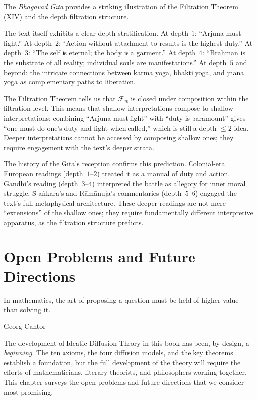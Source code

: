 \documentclass[11pt,openany]{book}
\theoremstyle{definition}
\theoremstyle{plain}
\theoremstyle{remark}
\newcommand{\Filt}[1]{\mathcal{F}_{#1}}     %
\begin{document}
The \emph{Bhagavad G\=\i t\=a} provides a striking illustration of the Filtration Theorem (XIV) and the depth filtration structure.

The text itself exhibits a clear depth stratification. At depth~$1$: ``Arjuna must fight.'' At depth~$2$: ``Action without attachment to results is the highest duty.'' At depth~$3$: ``The self is eternal; the body is a garment.'' At depth~$4$: ``Brahman is the substrate of all reality; individual souls are manifestations.'' At depth~$5$ and beyond: the intricate connections between karma yoga, bhakti yoga, and jnana yoga as complementary paths to liberation.

The Filtration Theorem tells us that $\Filt{m}$ is closed under composition within the filtration level. This means that shallow interpretations compose to shallow interpretations: combining ``Arjuna must fight'' with ``duty is paramount'' gives ``one must do one's duty and fight when called,'' which is still a depth-$\leq 2$ idea. Deeper interpretations cannot be accessed by composing shallow ones; they require engagement with the text's deeper strata.

The history of the G\=\i t\=a's reception confirms this prediction. Colonial-era European readings (depth~$1$--$2$) treated it as a manual of duty and action. Gandhi's reading (depth~$3$--$4$) interpreted the battle as allegory for inner moral struggle. \=S a\.nkara's and R\=am\=anuja's commentaries (depth~$5$--$6$) engaged the text's full metaphysical architecture. These deeper readings are not mere ``extensions'' of the shallow ones; they require fundamentally different interpretive apparatus, as the filtration structure predicts.



\chapter{Open Problems and Future Directions}
\label{ch:open}

\epigraph{In mathematics, the art of proposing a question must be held of higher value than solving it.}{Georg Cantor}

The development of Ideatic Diffusion Theory in this book has been, by design, a \emph{beginning}. The ten axioms, the four diffusion models, and the key theorems establish a foundation, but the full development of the theory will require the efforts of mathematicians, literary theorists, and philosophers working together. This chapter surveys the open problems and future directions that we consider most promising.
\end{document}
